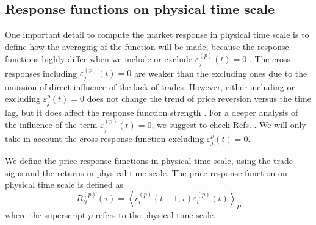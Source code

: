 

\subsection{Response functions on physical time scale}
\label{subsec:response_function_physical}

One important detail to compute the market response in physical time scale is
to define how the averaging of the function will be made, because the
response functions highly differ when we include or exclude
$\varepsilon^{\left(p\right)}_j \left( t\right) = 0$ \cite{Wang_2016_cross}.
The cross-responses including
$\varepsilon^{\left(p\right)}_j \left( t\right) = 0$ are weaker than the
excluding ones due to the omission of direct influence of the lack of trades.
However, either including or excluding $\varepsilon^{p}_j \left( t\right) = 0$
does not change the trend of price reversion versus the time lag, but it does
affect the response function strength \cite{Wang_2016_avg}. For a deeper
analysis of the influence of the term
$\varepsilon^{\left(p\right)}_j \left( t\right) = 0$, we suggest to check Refs.
\cite{Wang_2016_avg,Wang_2016_cross}. We will only take in account the
cross-response function excluding $\varepsilon^{p}_j \left( t\right) = 0$.

We define the price response functions in physical time scale, using
the trade signs and the returns in physical time scale. The price response
function on physical time scale is defined as
\begin{equation}\label{eq:response_functions_time_scale_general}
    R^{\left(p\right)}_{ii}\left(\tau\right)=\left\langle r^{\left(p\right)}
    _{i}\left(t-1, \tau\right) \varepsilon_{i}^{\left(p\right)} \left(t\right)
    \right\rangle _{P}
\end{equation}
where the superscript $p$ refers to the physical time scale.

